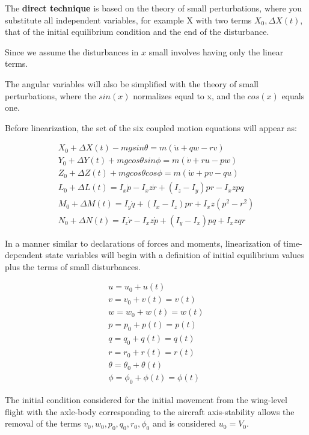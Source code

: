The \textbf{direct technique} is based on the theory of small perturbations, where you substitute all independent variables, for example X with two terms $X_0,\Delta X(t)$, that of the initial equilibrium condition and the end of the disturbance. 

Since we assume the disturbances in $x$ small involves having only the linear terms. 

The angular variables will also be simplified with the theory of small perturbations, where the $sin(x)$ normalizes equal to x, and the $cos(x)$ equals one.  

Before linearization, the set of the six coupled motion equations will appear as:

\begin{gather}
    X_0 + \Delta X(t) - mg sin\theta = m(\dot u + qw - rv) \\
    Y_0 + \Delta Y(t) + mg cos\theta sin\phi = m (\dot v + ru - pw) \\
    Z_0 + \Delta Z(t) + mg cos\theta cos \phi = m ( \dot w + pv - qu) \\
    L_0 + \Delta L(t) = I_x \dot p - I_xz \dot r + (I_z - I_y)pr - I_xz pq \\
    M_0 + \Delta M(t) = I_y \dot q + (I_x - I_z) pr + I_xz (p^2 - r^2) \\
    N_0 + \Delta N(t) = I_z \dot r - I_xz \dot p + (I_y - I_x)pq + I_xz qr
\end{gather}


In a manner similar to declarations of forces and moments, linearization of time-dependent state variables will begin with a definition of initial equilibrium values plus the terms of small disturbances.

\begin{gather}
    u = u_0 + u(t) \\
    v = v_0 + v(t) = v(t) \\
    w = w_0 + w(t) = w(t) \\
    p = p_0 + p(t) = p(t) \\
    q = q_0 + q(t) = q(t)  \\
    r = r_0 + r(t) = r(t) \\
    \theta = \theta_0 + \theta(t) \\
    \phi = \phi_0 + \phi(t) = \phi(t) 
\end{gather}

The initial condition considered for the initial movement from the wing-level flight with the axle-body corresponding to the aircraft axis-stability allows the removal of the terms $v_0, w_0, p_0, q_0, r_0, \phi_0$ and is considered $u_0 = V_0$.

